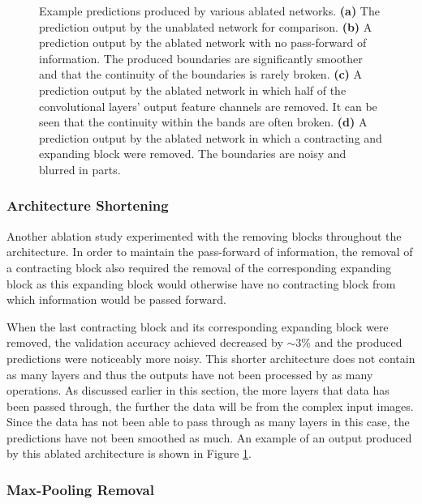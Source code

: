 \begin{figure}[!t]
\begin{subfigure}[t]{0.24\textwidth}
        \caption{}
    \end{subfigure}
    \caption{Example predictions produced by various ablated networks. \textbf{(a)} The prediction output by the unablated network for comparison. \textbf{(b)} A prediction output by the ablated network with no pass-forward of information. The produced boundaries are significantly smoother and that the continuity of the boundaries is rarely broken. \textbf{(c)} A prediction output by the ablated network in which half of the convolutional layers' output feature channels are removed. It can be seen that the continuity within the bands are often broken. \textbf{(d)} A prediction output by the ablated network in which a contracting and expanding block were removed. The boundaries are noisy and blurred in parts.}
    \label{fig:ablation}
\end{figure}

\subsubsection{Architecture Shortening}

Another ablation study experimented with the removing blocks throughout the architecture. In order to maintain the pass-forward of information, the removal of a contracting block also required the removal of the corresponding expanding block as this expanding block would otherwise have no contracting block from which information would be passed forward.

When the last contracting block and its corresponding expanding block were removed, the validation accuracy achieved decreased by ${\sim}3\%$ and the produced predictions were noticeably more noisy. This shorter architecture does not contain as many layers and thus the outputs have not been processed by as many operations. As discussed earlier in this section, the more layers that data has been passed through, the further the data will be from the complex input images. Since the data has not been able to pass through as many layers in this case, the predictions have not been smoothed as much. An example of an output produced by this ablated architecture is shown in Figure \ref{fig:ablation}.

\subsubsection{Max-Pooling Removal}

